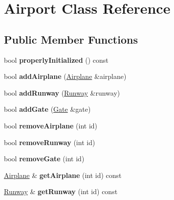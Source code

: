 \hypertarget{class_airport}{}\section{Airport Class Reference}
\label{class_airport}
\subsection*{Public Member Functions}
\begin{DoxyCompactItemize}
\item 
\mbox{\label{class_airport_aa13e68ac58e8875837fbe888325cfff6}} 
bool {\bfseries properly\+Initialized} () const
\item 
\mbox{\label{class_airport_a3dcccae7a922584cac1b13f30c6f01e6}} 
bool {\bfseries add\+Airplane} (\mbox{\hyperlink{class_airplane}{Airplane}} \&airplane)
\item 
\mbox{\label{class_airport_a6bb6b5235cd5608a5ed2c7355f1436c5}} 
bool {\bfseries add\+Runway} (\mbox{\hyperlink{class_runway}{Runway}} \&runway)
\item 
\mbox{\label{class_airport_a41e4e51e7cb2542afd89ec1ff4192c6e}} 
bool {\bfseries add\+Gate} (\mbox{\hyperlink{class_gate}{Gate}} \&gate)
\item 
\mbox{\label{class_airport_a4e4929a17d410aac86d2d518648e4284}} 
bool {\bfseries remove\+Airplane} (int id)
\item 
\mbox{\label{class_airport_adb2735f0f7402bdf3946b17b10498b67}} 
bool {\bfseries remove\+Runway} (int id)
\item 
\mbox{\label{class_airport_ad0c61d46c5c811fb9a2d45be1826088c}} 
bool {\bfseries remove\+Gate} (int id)
\item 
\mbox{\label{class_airport_a3b7a35fc5925f2c634846c316a7aaea8}} 
\mbox{\hyperlink{class_airplane}{Airplane}} \& {\bfseries get\+Airplane} (int id) const
\item 
\mbox{\label{class_airport_a15f0fc6f556d570481226b403823d169}} 
\mbox{\hyperlink{class_runway}{Runway}} \& {\bfseries get\+Runway} (int id) const

\end{DoxyCompactItemize}
